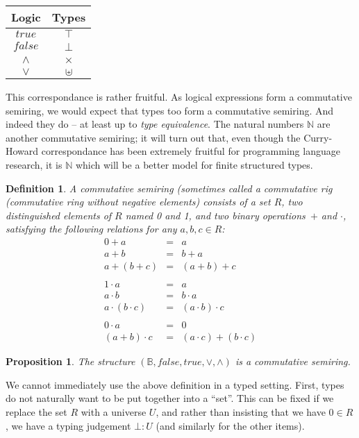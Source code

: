 \documentclass{article}
\newtheorem{defn}{Definition}[section]
\newtheorem{prop}{Proposition}[section]
\newcommand{\Nat}{\ensuremath{\mathbb{N}}}
\newcommand{\true}{\mathit{true}}
\newcommand{\false}{\mathit{false}}
\begin{document}
\begin{center}
\begin{tabular}{c|c}
Logic & Types \\ \hline
$\true$ & $\top$ \\
$\false$ & $\bot$ \\
$\land$ & $\times$ \\
$\lor$ & $\uplus$ \\
\end{tabular}
\end{center}

This correspondance is rather fruitful. As logical expressions form
a commutative semiring, we would expect that types too form a commutative
semiring. And indeed they do -- at least up to \emph{type equivalence}.  The
natural numbers $\Nat$ are another commutative semiring; it will turn out that,
even though the Curry-Howard correspondance has been extremely fruitful for
programming language research, it is $\Nat$ which will be a better model for
finite structured types.

\begin{defn}
  A \emph{commutative semiring} (sometimes called a \emph{commutative
    rig} (commutative ri\emph{n}g without negative elements) consists of a
  set $R$, two distinguished elements of $R$ named 0 and 1, and two
  binary operations~$+$ and $\cdot$, satisfying the following
  relations for any $a,b,c \in R$:
\[\begin{array}{rcl}
0 + a &=& a \\
a + b &=& b + a \\
a + (b + c) &=& (a + b) + c \\
\\
1 \cdot a &=& a \\
a \cdot b &=& b \cdot a \\
a \cdot (b \cdot c) &=& (a \cdot b) \cdot c \\
\\
0 \cdot a &=& 0 \\
(a + b) \cdot c &=& (a \cdot c) + (b \cdot c)
\end{array}\]
\end{defn}

\begin{prop}
The structure $\left(\mathbb{B}, \false, \true, \lor, \land\right)$
is a commutative semiring.
\end{prop}

We cannot immediately use the above definition in a typed setting.
First, types do not naturally want to be put together into a ``set''.
This can be fixed if we replace the set $R$ with a universe $U$, and
rather than insisting that we have $0 \in R$, we have a typing
judgement $\bot : U$ (and similarly for the other items).
\end{document}
